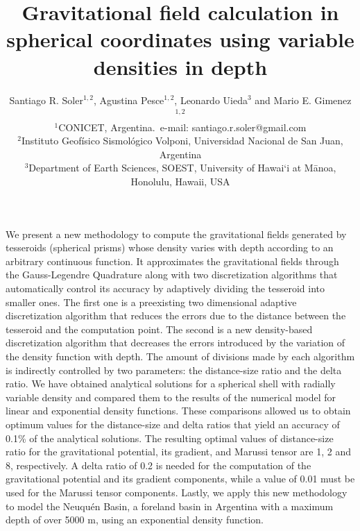 \documentclass[extra, referee]{gji}
\begin{document}
\title[Variable Density Tesseroids]{
    Gravitational field calculation in spherical coordinates using variable
    densities in depth
}
\author[S.R. Soler, A. Pesce, L. Uieda and M.E. Gimenez]{
    Santiago R. Soler$^{1,2}$, Agustina Pesce$^{1,2}$, Leonardo Uieda$^3$ and
    Mario E. Gimenez$^{1,2}$ \\
    $^1$CONICET, Argentina.~e-mail: santiago.r.soler@gmail.com\\
    $^2$Instituto Geofísico Sismológico Volponi, Universidad Nacional de
    San Juan, Argentina\\
    $^3$Department of Earth Sciences, SOEST, University of Hawai‘i at
    M\={a}noa, Honolulu, Hawaii, USA
}


\maketitle

\begin{summary}
We present a new methodology to compute the gravitational fields generated by
tesseroids (spherical prisms) whose density varies with depth according to
an arbitrary continuous function.
It approximates the gravitational fields through the Gauss-Legendre Quadrature along
with two discretization algorithms that automatically control its accuracy by adaptively
dividing the tesseroid into smaller ones.
The first one is a preexisting two dimensional adaptive discretization algorithm that
reduces the errors due to the distance between the tesseroid and the computation point.
The second is a new density-based discretization algorithm that
decreases the errors introduced by the variation of the density function with depth.
The amount of divisions made by each algorithm is indirectly controlled
by two parameters: the distance-size ratio and the delta ratio.
We have obtained analytical solutions for a spherical shell with radially variable
density and compared them to the results of the numerical model for linear and
exponential density functions.
These comparisons allowed us to obtain optimum values for the distance-size and
delta ratios that yield an accuracy of 0.1\% of the analytical solutions.
The resulting optimal values of distance-size ratio for the gravitational potential, its
gradient, and Marussi tensor are 1, 2 and 8, respectively.
A delta ratio of 0.2 is needed for the computation of the gravitational potential and
its gradient components, while a value of 0.01 must be used for the Marussi tensor
components.
Lastly, we apply this new methodology to model the Neuqu\'en Basin, a foreland basin in
Argentina with a maximum depth of over 5000 m, using an exponential density function.
\end{summary}
\end{document}
